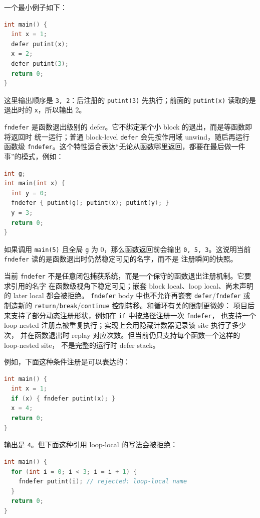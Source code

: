\documentclass[UTF8,a4paper,11pt]{ctexart}
\begin{document}
一个最小例子如下：

\begin{lstlisting}[language=C]
int main() {
  int x = 1;
  defer putint(x);
  x = 2;
  defer putint(3);
  return 0;
}
\end{lstlisting}

这里输出顺序是 \texttt{3, 2}：后注册的 \texttt{putint(3)} 先执行；前面的
\texttt{putint(x)} 读取的是退出时的 \texttt{x}，所以输出 2。

\texttt{fndefer} 是函数退出级别的 defer。它不绑定某个小 block 的退出，而是等函数即将返回时
统一运行；普通 block-level \texttt{defer} 会先按作用域 unwind，随后再运行函数级
\texttt{fndefer}。这个特性适合表达“无论从函数哪里返回，都要在最后做一件事”的模式，例如：

\begin{lstlisting}[language=C]
int g;
int main(int x) {
  int y = 0;
  fndefer { putint(g); putint(x); putint(y); }
  y = 3;
  return 0;
}
\end{lstlisting}

如果调用 \texttt{main(5)} 且全局 \texttt{g} 为 0，那么函数返回前会输出
\texttt{0, 5, 3}。这说明当前 \texttt{fndefer} 读的是函数退出时仍然稳定可见的名字，而不是
注册瞬间的快照。

当前 \texttt{fndefer} 不是任意闭包捕获系统，而是一个保守的函数退出注册机制。它要求引用的名字
在函数级视角下稳定可见；嵌套 block local、loop local、尚未声明的 later local 都会被拒绝。
\texttt{fndefer} body 中也不允许再嵌套 \texttt{defer}/\texttt{fndefer} 或制造新的
\texttt{return}/\texttt{break}/\texttt{continue} 控制转移。和循环有关的限制更微妙：
项目后来支持了部分动态注册形状，例如在 \texttt{if} 中按路径注册一次 \texttt{fndefer}，
也支持一个 loop-nested 注册点被重复执行；实现上会用隐藏计数器记录该 site 执行了多少次，
并在函数退出时 replay 对应次数。但当前仍只支持每个函数一个这样的 loop-nested site，
不是完整的运行时 defer stack。

例如，下面这种条件注册是可以表达的：

\begin{lstlisting}[language=C]
int main() {
  int x = 1;
  if (x) { fndefer putint(x); }
  x = 4;
  return 0;
}
\end{lstlisting}

输出是 \texttt{4}。但下面这种引用 loop-local 的写法会被拒绝：

\begin{lstlisting}[language=C]
int main() {
  for (int i = 0; i < 3; i = i + 1) {
    fndefer putint(i); // rejected: loop-local name
  }
  return 0;
}
\end{lstlisting}
\end{document}
